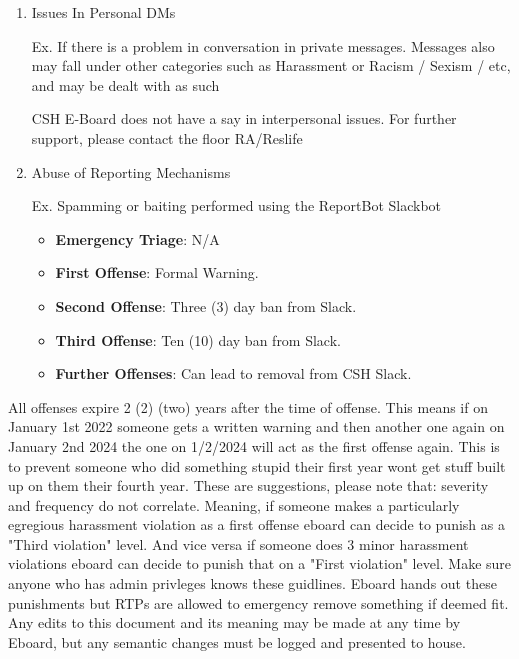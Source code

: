 \documentclass{article}
\begin{document}
\begin{enumerate}[I]
\item Issues In Personal DMs

Ex. If there is a problem in conversation in private messages. Messages also may fall under other categories such as Harassment or Racism / Sexism / etc, and may be dealt with as such

CSH E-Board does not have a say in interpersonal issues. For further support, please contact the floor RA/Reslife

\item Abuse of Reporting Mechanisms

Ex. Spamming or baiting performed using the ReportBot Slackbot
\begin{itemize}
    \item \textbf{Emergency Triage}: N/A
    \item \textbf{First Offense}: Formal Warning.
    \item \textbf{Second Offense}: Three (3) day ban from Slack.
    \item \textbf{Third Offense}: Ten (10) day ban from Slack.
    \item \textbf{Further Offenses}: Can lead to removal from CSH Slack.
\end{itemize}

\end{enumerate}

All offenses expire 2 (2) (two) years after the time of offense.
This means if on January 1st 2022 someone gets a written warning and then another one again on January 2nd 2024 the one on 1/2/2024 will act as the first offense again.
This is to prevent someone who did something stupid their first year wont get stuff built up on them their fourth year.
These are suggestions, please note that: severity and frequency do not correlate.
Meaning, if someone makes a particularly egregious harassment violation as a first offense eboard can decide to punish as a "Third violation" level.
And vice versa if someone does 3 minor harassment violations eboard can decide to punish that on a "First violation" level. Make sure anyone who has admin privleges knows these guidlines.
Eboard hands out these punishments but RTPs are allowed to emergency remove something if deemed fit.
Any edits to this document and its meaning may be made at any time by Eboard, but any semantic changes must be logged and presented to house.
\end{document}

